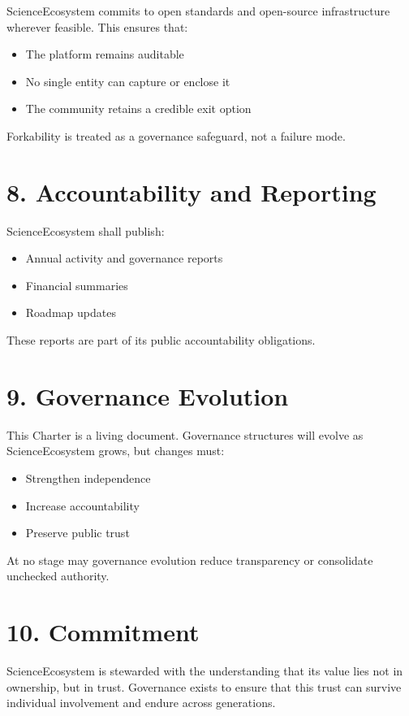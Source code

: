 ScienceEcosystem commits to open standards and open-source infrastructure wherever feasible. This ensures that:
\begin{itemize}
    \item The platform remains auditable
    \item No single entity can capture or enclose it
    \item The community retains a credible exit option
\end{itemize}

Forkability is treated as a governance safeguard, not a failure mode.

\section*{8. Accountability and Reporting}

ScienceEcosystem shall publish:
\begin{itemize}
    \item Annual activity and governance reports
    \item Financial summaries
    \item Roadmap updates
\end{itemize}

These reports are part of its public accountability obligations.

\section*{9. Governance Evolution}

This Charter is a living document. Governance structures will evolve as ScienceEcosystem grows, but changes must:
\begin{itemize}
    \item Strengthen independence
    \item Increase accountability
    \item Preserve public trust
\end{itemize}

At no stage may governance evolution reduce transparency or consolidate unchecked authority.

\section*{10. Commitment}

ScienceEcosystem is stewarded with the understanding that its value lies not in ownership, but in trust. Governance exists to ensure that this trust can survive individual involvement and endure across generations.


